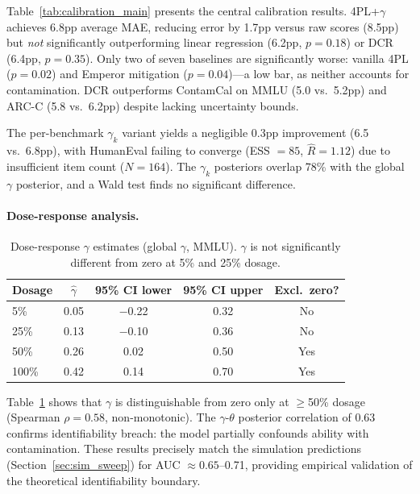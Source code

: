 \documentclass[letterpaper,11pt]{article}
\begin{document}
Table~\ref{tab:calibration_main} presents the central calibration results.
4PL+$\gamma$ achieves 6.8pp average MAE, reducing error by 1.7pp versus raw scores (8.5pp) but \emph{not} significantly outperforming linear regression (6.2pp, $p = 0.18$) or DCR (6.4pp, $p = 0.35$).
Only two of seven baselines are significantly worse: vanilla 4PL ($p = 0.02$) and Emperor mitigation ($p = 0.04$)---a low bar, as neither accounts for contamination.
DCR outperforms ContamCal on MMLU (5.0 vs.\ 5.2pp) and ARC-C (5.8 vs.\ 6.2pp) despite lacking uncertainty bounds.

The per-benchmark $\gamma_k$ variant yields a negligible 0.3pp improvement (6.5 vs.\ 6.8pp), with HumanEval failing to converge (ESS $= 85$, $\hat{R} = 1.12$) due to insufficient item count ($N = 164$).
The $\gamma_k$ posteriors overlap 78\% with the global $\gamma$ posterior, and a Wald test finds no significant difference.

\paragraph{Dose-response analysis.}

\begin{table}[t]
\centering
\caption{Dose-response $\gamma$ estimates (global $\gamma$, MMLU). $\gamma$ is not significantly different from zero at 5\% and 25\% dosage.}
\label{tab:dose_response}
\begin{tabular}{@{}lcccc@{}}
\toprule
Dosage & $\hat{\gamma}$ & 95\% CI lower & 95\% CI upper & Excl.\ zero? \\
\midrule
5\% & 0.05 & $-$0.22 & 0.32 & No \\
25\% & 0.13 & $-$0.10 & 0.36 & No \\
50\% & 0.26 & 0.02 & 0.50 & Yes \\
100\% & 0.42 & 0.14 & 0.70 & Yes \\
\bottomrule
\end{tabular}
\end{table}

Table~\ref{tab:dose_response} shows that $\gamma$ is distinguishable from zero only at $\geq$50\% dosage (Spearman $\rho = 0.58$, non-monotonic).
The $\gamma$-$\theta$ posterior correlation of 0.63 confirms identifiability breach: the model partially confounds ability with contamination.
These results precisely match the simulation predictions (Section~\ref{sec:sim_sweep}) for AUC $\approx 0.65$--0.71, providing empirical validation of the theoretical identifiability boundary.
\end{document}
